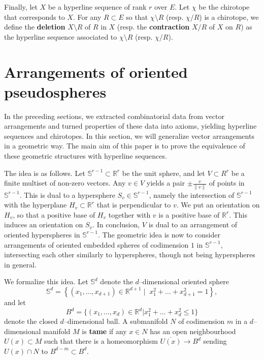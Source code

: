 \documentclass[a4paper]{amsart}
\newcommand{\begriff}[1]{\textbf{#1}}
\newcommand{\p}{\mathbb S}
\theoremstyle{definition}
\theoremstyle{remark}
\begin{document}
Finally, let $X$ be a hyperline sequence of rank $r$ over $E$. Let
$\chi$ be the chirotope that corresponds to $X$. For any $R\subset E$ so
that $\chi\setminus R$ (resp. $\chi/R$) is a chirotope, we define the
\begriff{deletion} $X\setminus R$ of $R$ in $X$ (resp. the
\begriff{contraction} $X/R$ of $X$ on $R$) as the hyperline sequence
associated to $\chi\setminus R$ (resp. $\chi/R$).



\section{Arrangements of oriented pseudospheres}
\label{sec:PSA}

In the preceding sections, we extracted combinatorial data from vector
arrangements and turned properties of these data into axioms, yielding
hyperline sequences and chirotopes. In this section, we will generalize
vector arrangements in a geometric way. The main aim of this paper is to
prove the equivalence of these geometric structures with hyperline
sequences. 

The idea is as follows. Let $\p^{r-1}\subset \mathbb R^r$ be the unit
sphere, and let $V\subset R^r$ be a finite multiset of non-zero
vectors. Any $v\in V$ yields a pair $\pm \frac{v}{\|v\|}$ of points in
$\p^{r-1}$. This is dual to a hypersphere $S_v\in\p^{r-1}$, namely
the intersection of $\p^{r-1}$ with the hyperplane $H_v\subset \mathbb
R^r$ that is perpendicular to $v$. We put an
orientation on $H_v$, so that a positive base of $H_v$ together with $v$
is a positive base of $\mathbb R^r$. This induces an orientation on
$S_v$. 
In conclusion, $V$ is dual to an arrangement of oriented hyperspheres in
$\p^{r-1}$. The geometric idea is now to consider arrangements of
oriented embedded spheres of codimension $1$ in $\p^{r-1}$, intersecting
each other similarly to hyperspheres, though not being hyperspheres in
general. 

We formalize this idea.
Let $\p^d$ denote the $d$--dimensional oriented sphere 
$$\p^d = \left\{\left(x_1,\dots,x_{d+1}\right)\in\mathbb R^{d+1}\;|\;\;
                     x_1^2+\dots + x_{d+1}^2 = 1\right\},$$
%
and let
$$B^d=\big\{(x_1,\dots,x_{d}) \in \mathbb R^d | x_1^2+\dots +
 x_{d}^2 \le 1 \big\}$$
denote the closed $d$--dimensional ball.
%
A submanifold $N$ of codimension $m$ in a $d$--dimensional manifold $M$
is \begriff{tame} if any $x\in N$ has  an open neighbourhood
$U(x)\subset M$ such that there is a homeomorphism $\overline{U(x)}\to
B^d$ sending $U(x)\cap N$ to $B^{d-m}\subset B^d$. 
\end{document}
